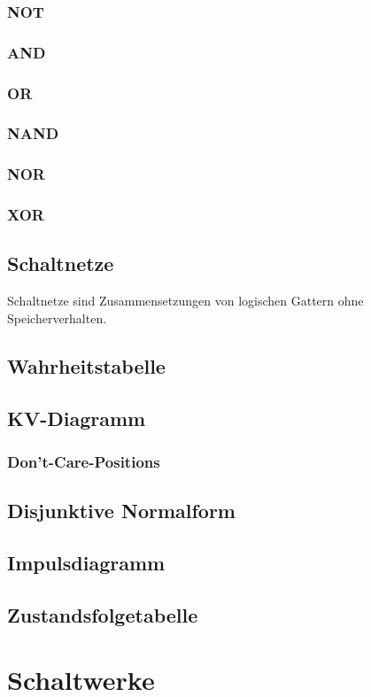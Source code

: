 \documentclass[12pt,a4paper]{article}
\begin{document}
\subsubsection{NOT}%
\subsubsection{AND}
\subsubsection{OR}
\subsubsection{NAND}
\subsubsection{NOR}
\subsubsection{XOR}
\subsection{Schaltnetze}
Schaltnetze sind Zusammensetzungen von logischen Gattern ohne Speicherverhalten.
\subsection{Wahrheitstabelle}
\subsection{KV-Diagramm}
\subsubsection{Don't-Care-Positions}
\subsection{Disjunktive Normalform}
\subsection{Impulsdiagramm}
\subsection{Zustandsfolgetabelle}
\section{Schaltwerke}
\end{document}
